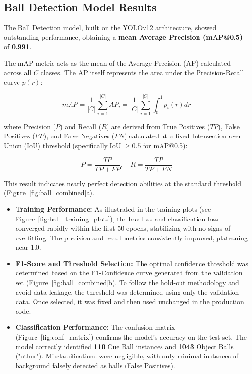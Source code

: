 \subsection{Ball Detection Model Results}
The Ball Detection model, built on the YOLOv12 architecture, showed outstanding performance, obtaining a \textbf{mean Average Precision (mAP@0.5)} of \textbf{0.991}.

The mAP metric acts as the mean of the Average Precision (AP) calculated across all $C$ classes. The AP itself represents the area under the Precision-Recall curve $p(r)$:

\begin{equation}
    mAP = \frac{1}{|C|} \sum_{i=1}^{|C|} AP_i = \frac{1}{|C|} \sum_{i=1}^{|C|} \int_{0}^{1} p_i(r) dr
\end{equation}

where Precision ($P$) and Recall ($R$) are derived from True Positives ($TP$), False Positives ($FP$), and False Negatives ($FN$) calculated at a fixed Intersection over Union (IoU) threshold (specifically IoU $\geq 0.5$ for mAP@0.5):

\begin{equation}
    P = \frac{TP}{TP + FP}, \quad R = \frac{TP}{TP + FN}
\end{equation}

This result indicates nearly perfect detection abilities at the standard threshold (Figure~\ref{fig:ball_combined}a).

\begin{itemize}
    \item \textbf{Training Performance:} As illustrated in the training plots (see Figure~\ref{fig:ball_training_plots}), the box loss and classification loss converged rapidly within the first 50 epochs, stabilizing with no signs of overfitting. The precision and recall metrics consistently improved, plateauing near 1.0.
    \item \textbf{F1-Score and Threshold Selection:} The optimal confidence threshold was determined based on the F1-Confidence curve generated from the validation set (Figure~\ref{fig:ball_combined}b). To follow the hold-out methodology and avoid data leakage, the threshold was determined using only the validation data. Once selected, it was fixed and then used unchanged in the production code.
    \item \textbf{Classification Performance:} The confusion matrix (Figure~\ref{fig:conf_matrix}) confirms the model's accuracy on the test set. The model correctly identified \textbf{110} Cue Ball instances and \textbf{1043} Object Balls ("other"). Misclassifications were negligible, with only minimal instances of background falsely detected as balls (False Positives).
\end{itemize}

